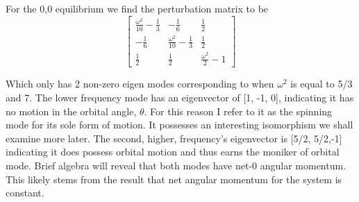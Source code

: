 \documentclass[prb,preprint]{revtex4-1}
\begin{document}
For the 0,0 equilibrium we find the perturbation matrix to be
\begin{equation}
	\left[\begin{matrix}\frac{\omega^{2}}{10} - \frac{1}{3} & - \frac{1}{6} & \frac{1}{2}\\
	- \frac{1}{6} & \frac{\omega^{2}}{10} - \frac{1}{3} & \frac{1}{2}\\
	\frac{1}{2} & \frac{1}{2} & \frac{\omega^{2}}{2} - 1\end{matrix}\right]
\end{equation}

Which only has 2 non-zero eigen modes corresponding to when $\omega^2$ is equal to 5/3 and 7. The lower frequency mode has an eigenvector of [1, -1, 0], indicating it has no motion in the orbital angle, $\theta$. For this reason I refer to it as the spinning mode for its sole form of motion. It possesses an interesting isomorphism we shall examine more later. The second, higher, frequency's eigenvector is [5/2, 5/2,-1] indicating it does possess orbital motion and thus earns the moniker of orbital mode. Brief algebra will reveal that both modes have net-0 angular momentum. This likely stems from the result that net angular momentum for the system is constant.
\end{document}

